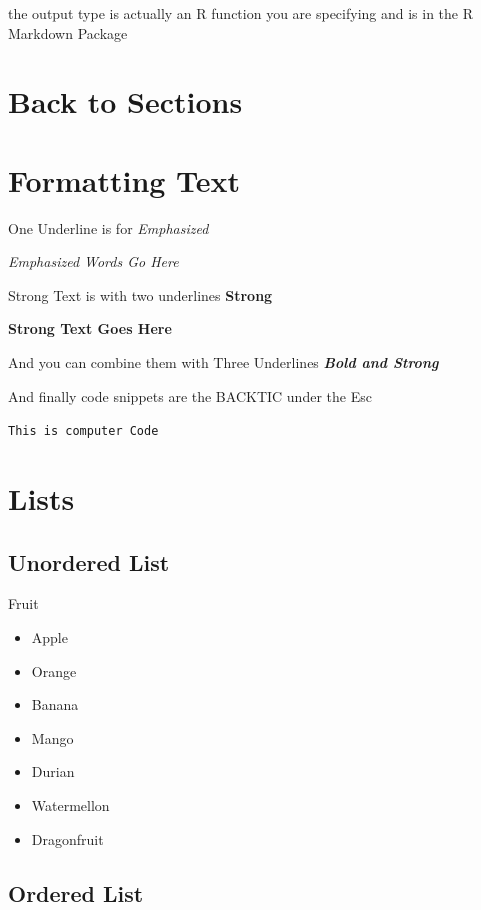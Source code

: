 \documentclass[]{article}
\providecommand{\tightlist}{%
  \setlength{\itemsep}{0pt}\setlength{\parskip}{0pt}}
\begin{document}
the output type is actually an R function you are specifying and is in
the R Markdown Package

\hypertarget{back-to-sections}{%
\section{Back to Sections}\label{back-to-sections}}

\hypertarget{formatting-text}{%
\section{Formatting Text}\label{formatting-text}}

One Underline is for \emph{Emphasized}

\emph{Emphasized Words Go Here}

Strong Text is with two underlines \textbf{Strong}

\textbf{Strong Text Goes Here}

And you can combine them with Three Underlines \textbf{\emph{Bold and
Strong}}

And finally code snippets are the BACKTIC under the Esc

\texttt{This\ is\ computer\ Code}

\hypertarget{lists}{%
\section{Lists}\label{lists}}

\hypertarget{unordered-list}{%
\subsection{Unordered List}\label{unordered-list}}

Fruit

\begin{itemize}
\tightlist
\item
  Apple
\item
  Orange
\item
  Banana
\item
  Mango
\item
  Durian
\item
  Watermellon
\item
  Dragonfruit
\end{itemize}

\hypertarget{ordered-list}{%
\subsection{Ordered List}\label{ordered-list}}
\end{document}

